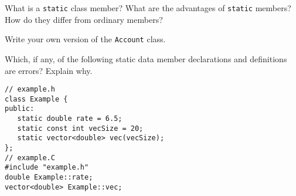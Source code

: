 %
%
\begin{question}
What is a \verb|static| class member? What are the advantages
of \verb|static| members? How do they differ from ordinary members?
\end{question}

\begin{question}
Write your own version of the \verb|Account| class.
\end{question}

\begin{question}
Which, if any, of the following static data member
declarations and definitions are errors? Explain why.
\begin{lstlisting}
// example.h
class Example {
public:
   static double rate = 6.5;
   static const int vecSize = 20;
   static vector<double> vec(vecSize);
};
// example.C
#include "example.h"
double Example::rate;
vector<double> Example::vec;
\end{lstlisting}
\end{question}
